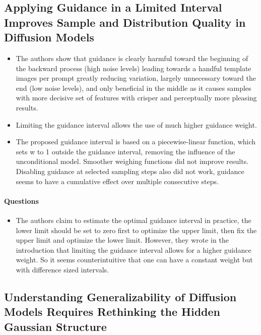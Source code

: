 \documentclass{article}
\begin{document}
\subsection{Applying Guidance in a Limited Interval Improves Sample and Distribution Quality in Diffusion Models}


\begin{itemize}
    \item The authors show that guidance is clearly harmful toward the beginning of the backward process (high noise levels) leading towards a handful template images per prompt greatly reducing variation, largely unnecessary toward the end (low noise levels), and only beneficial in the middle as it causes samples with more decisive set of features with crisper and perceptually more pleasing results. 
    \item Limiting the guidance interval allows the use of much higher guidance weight.
    \item The proposed guidance interval is based on a piecewise-linear function, which sets w to 1 outside the guidance interval, removing the influence of the unconditional model. Smoother weighing functions did not improve results. Disabling guidance at selected sampling steps also did not work, guidance seems to have a cumulative effect over multiple consecutive steps.
\end{itemize}

\paragraph{Questions}
\begin{itemize}
    \item The authors claim to estimate the optimal guidance interval in practice, the lower limit should be set to zero first to optimize the upper limit, then fix the upper limit and optimize the lower limit. However, they wrote in the introduction that limiting the guidance interval allows for a higher guidance weight. So it seems counterintuitive that one can have a constant weight but with difference sized intervals.
\end{itemize}

\subsection{Understanding Generalizability of Diffusion Models Requires Rethinking the Hidden Gaussian Structure}
\end{document}
